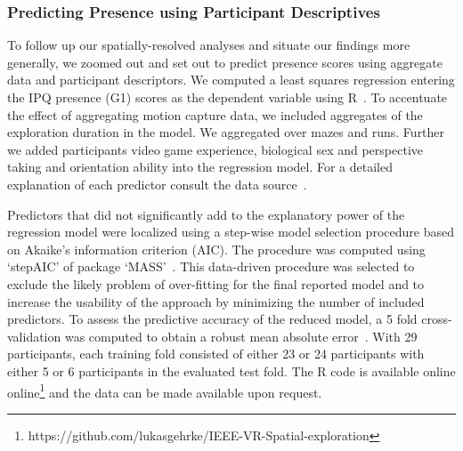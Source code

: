 \subsubsection{Predicting Presence using Participant Descriptives} 
To follow up our spatially-resolved analyses and situate our findings more generally, we zoomed out and set out to predict presence scores using aggregate data and participant descriptors. We computed a least squares regression entering the IPQ presence (G1) scores as the dependent variable using R~\cite{RFoundationforStatisticalComputing.2018}. To accentuate the effect of aggregating motion capture data, we included aggregates of the exploration duration in the model. We aggregated over mazes and runs. Further we added participants video game experience, biological sex and perspective taking and orientation ability into the regression model. For a detailed explanation of each predictor consult the data source~\cite{Gehrke2018}. 

Predictors that did not significantly add to the explanatory power of the regression model were localized using a step-wise model selection procedure based on Akaike's information criterion (AIC). The procedure was computed using `stepAIC' of package `MASS'~\cite{Akaike1998a, Venables2002}. This data-driven procedure was selected to exclude the likely problem of over-fitting for the final reported model and to increase the usability of the approach by minimizing the number of included predictors. To assess the predictive accuracy of the reduced model, a 5 fold cross-validation was computed to obtain a robust mean absolute error~\cite{Mosteller1968, Furnkranz2011}. With 29 participants, each training fold consisted of either 23 or 24 participants with either 5 or 6 participants in the evaluated test fold. The R code is available online online\footnote{https://github.com/lukasgehrke/IEEE-VR-Spatial-exploration} and the data can be made available upon request.

